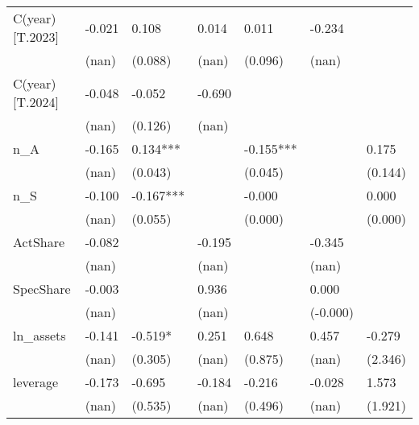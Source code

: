 \begin{table}
\begin{center}
\begin{tabular}{lllllll}
C(year)[T.2023]   & -0.021          & 0.108           & 0.014           & 0.011           & -0.234          &                  \\
                  & (nan)           & (0.088)         & (nan)           & (0.096)         & (nan)           &                  \\
C(year)[T.2024]   & -0.048          & -0.052          & -0.690          &                 &                 &                  \\
                  & (nan)           & (0.126)         & (nan)           &                 &                 &                  \\
n\_A              & -0.165          & 0.134***        &                 & -0.155***       &                 & 0.175            \\
                  & (nan)           & (0.043)         &                 & (0.045)         &                 & (0.144)          \\
n\_S              & -0.100          & -0.167***       &                 & -0.000          &                 & 0.000            \\
                  & (nan)           & (0.055)         &                 & (0.000)         &                 & (0.000)          \\
ActShare          & -0.082          &                 & -0.195          &                 & -0.345          &                  \\
                  & (nan)           &                 & (nan)           &                 & (nan)           &                  \\
SpecShare         & -0.003          &                 & 0.936           &                 & 0.000           &                  \\
                  & (nan)           &                 & (nan)           &                 & (-0.000)        &                  \\
ln\_assets        & -0.141          & -0.519*         & 0.251           & 0.648           & 0.457           & -0.279           \\
                  & (nan)           & (0.305)         & (nan)           & (0.875)         & (nan)           & (2.346)          \\
leverage          & -0.173          & -0.695          & -0.184          & -0.216          & -0.028          & 1.573            \\
                  & (nan)           & (0.535)         & (nan)           & (0.496)         & (nan)           & (1.921)          \\

\end{tabular}
\end{center}
\end{table}
